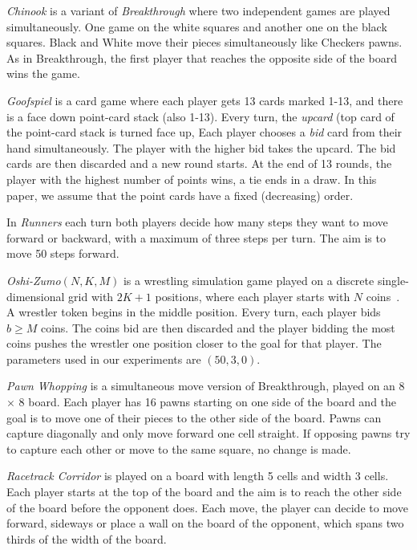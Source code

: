 \documentclass[conference]{IEEEtran}
\begin{document}
\textit{Chinook} is a variant of \textit{Breakthrough} where two independent games are played simultaneously. 
One game on the white squares and another one on the black squares. Black and White move their pieces simultaneously 
like Checkers pawns. As in Breakthrough, the first player that reaches the opposite side of the board wins the game. 

\textit{Goofspiel} is a card game where each player gets 13 cards marked 1-13, and there is a face down 
point-card stack (also 1-13). Every turn, the {\it upcard} (top card of the point-card stack is turned face up, 
Each player chooses a {\it bid} card from their hand simultaneously. 
The player with the higher bid takes the upcard. The bid cards are then discarded and a new round starts. 
At the end of 13 rounds, the player with the highest number of points wins, a tie ends in a draw.
In this paper, we assume that the point cards have a fixed (decreasing) order. 

In \textit{Runners} each turn both players decide how many steps they want to move forward or backward, with a maximum of three steps per turn. The aim is to move 50 steps forward.

\textit{Oshi-Zumo}$(N,K,M)$ is a wrestling simulation game played on a discrete single-dimensional grid with 
$2K+1$ positions, where each player starts with $N$ coins~\cite{Buro03OshiZumo}. A wrestler token begins in the middle 
position. Every turn, 
each player bids $b \ge M$ coins. The coins bid are then discarded and the player bidding the most coins pushes the 
wrestler one position closer to the goal for that player. The parameters used in our experiments are $(50,3,0)$.

\textit{Pawn Whopping} is a simultaneous move version of Breakthrough, played on an 8 $\times$ 8 board. Each player has 
16 pawns starting on one side of the board and the goal is to move one of their pieces to the other side of the board. 
Pawns can capture diagonally and only move forward one cell straight.
If opposing pawns try to capture each other or move to the same square, no change is made. 

\textit{Racetrack Corridor} is played on a board with length 5 cells and width 3 cells. Each player starts at the top of the board and the aim is to reach the other side of the board before the opponent does. Each move, the player can decide to move forward, sideways or place a wall on the board of the opponent, which spans two thirds of the width of the board.
\end{document}

